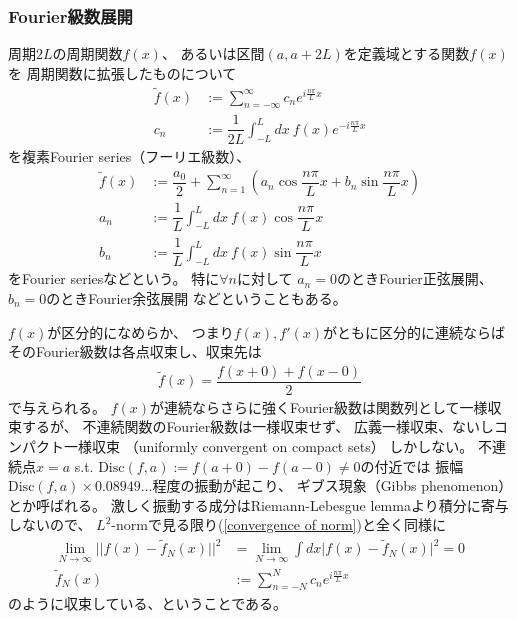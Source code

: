 \subsubsection{Fourier級数展開}

周期$2L$の周期関数$f(x)$、
あるいは区間$(a, a + 2L)$を定義域とする関数$f(x)$を
周期関数に拡張したものについて
\begin{subequations}
\begin{align}
    \tilde{f}(x)
    &:=
    \sum_{n=-\infty}^\infty
    c_n e^{ i\frac{n \pi}{L}x }
\\
    c_n
    &:=
    \dfrac{1}{2L} \int_{-L}^L dx\ 
    f(x) e^{ - i\frac{n \pi}{L}x }
\end{align}
\end{subequations}
を複素Fourier series（フーリエ級数）、
\begin{subequations}
\begin{align}
    \tilde{f}(x)
    &:=
    \dfrac{a_0}{2}
    +
    \sum_{n=1}^\infty
    \left(
        a_n \cos \dfrac{n \pi}{L}x
        +
        b_n \sin \dfrac{n \pi}{L}x
    \right)
\\
    a_n
    &:=
    \dfrac{1}{L} \int_{-L}^L dx\ 
    f(x) \cos\dfrac{n \pi}{L}x
\\
    b_n
    &:=
    \dfrac{1}{L} \int_{-L}^L dx\ 
    f(x) \sin\dfrac{n \pi}{L}x
\end{align}
\end{subequations}
をFourier seriesなどという。
特に$\forall n$に対して
$a_n = 0$のときFourier正弦展開、
$b_n = 0$のときFourier余弦展開
などということもある。

$f(x)$が区分的になめらか、
つまり$f(x), f'(x)$がともに区分的に連続ならば
そのFourier級数は各点収束し、収束先は
\begin{align}
    \tilde{f}(x) = \dfrac{f(x+0) + f(x-0)}{2}
\end{align}
で与えられる。
$f(x)$が連続ならさらに強くFourier級数は関数列として一様収束するが、
不連続関数のFourier級数は一様収束せず、
広義一様収束、ないしコンパクト一様収束
（uniformly convergent on compact sets）
しかしない。
不連続点$x = a$ s.t.
$\mathrm{Disc}(f,a) := f(a+0) - f(a-0) \neq 0$の付近では
振幅$\mathrm{Disc}(f,a) \times 0.08949\dots$程度の振動が起こり、
ギブス現象（Gibbs phenomenon）とか呼ばれる。
激しく振動する成分はRiemann-Lebesgue lemmaより積分に寄与しないので、
$L^2$-normで見る限り(\ref{convergence of norm})と全く同様に
\begin{subequations}
\begin{align}
    \lim_{N\to\infty}\bigg|\bigg|
        f(x) - \tilde{f}_N(x)
    \bigg|\bigg|^2
    &=
    \lim_{N\to\infty}\int dx
    \Big| f(x) - \tilde{f}_N(x) \Big|^2
    = 0
\\
    \tilde{f}_N(x)
    &:=
    \sum_{n=-N}^N
    c_n e^{ i\frac{n \pi}{L}x }
\end{align}
\end{subequations}
のように収束している、ということである。

